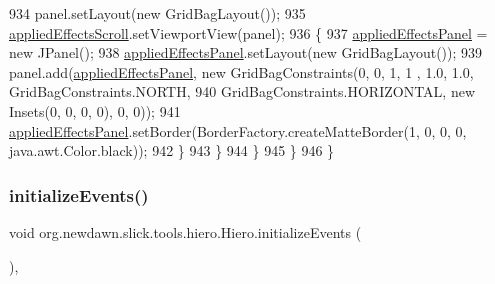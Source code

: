 \begin{DoxyCode}
934                     panel.setLayout(\textcolor{keyword}{new} GridBagLayout());
935                     \mbox{\hyperlink{classorg_1_1newdawn_1_1slick_1_1tools_1_1hiero_1_1_hiero_a0ee49b3aeb7a3ff8350e273ec5f54df9}{appliedEffectsScroll}}.setViewportView(panel);
936                     \{
937                         \mbox{\hyperlink{classorg_1_1newdawn_1_1slick_1_1tools_1_1hiero_1_1_hiero_af3ffcf548dfbc171feacb865c1302904}{appliedEffectsPanel}} = \textcolor{keyword}{new} JPanel();
938                         \mbox{\hyperlink{classorg_1_1newdawn_1_1slick_1_1tools_1_1hiero_1_1_hiero_af3ffcf548dfbc171feacb865c1302904}{appliedEffectsPanel}}.setLayout(\textcolor{keyword}{new} GridBagLayout());
939                         panel.add(\mbox{\hyperlink{classorg_1_1newdawn_1_1slick_1_1tools_1_1hiero_1_1_hiero_af3ffcf548dfbc171feacb865c1302904}{appliedEffectsPanel}}, \textcolor{keyword}{new} GridBagConstraints(0, 0, 1, 1
      , 1.0, 1.0, GridBagConstraints.NORTH,
940                             GridBagConstraints.HORIZONTAL, \textcolor{keyword}{new} Insets(0, 0, 0, 0), 0, 0));
941                         \mbox{\hyperlink{classorg_1_1newdawn_1_1slick_1_1tools_1_1hiero_1_1_hiero_af3ffcf548dfbc171feacb865c1302904}{appliedEffectsPanel}}.setBorder(BorderFactory.createMatteBorder(1,
       0, 0, 0, java.awt.Color.black));
942                     \}
943                 \}
944             \}
945         \}
946     \}
\end{DoxyCode}
\mbox{\label{classorg_1_1newdawn_1_1slick_1_1tools_1_1hiero_1_1_hiero_a542832d2b6b94a4fd1277d889b4ef8e2}} 
\subsubsection{\texorpdfstring{initialize\+Events()}{initializeEvents()}}
{\footnotesize\ttfamily void org.\+newdawn.\+slick.\+tools.\+hiero.\+Hiero.\+initialize\+Events (\begin{DoxyParamCaption}{ }\end{DoxyParamCaption})\hspace{0.3cm}{\ttfamily [inline]}, {\ttfamily [private]}}


